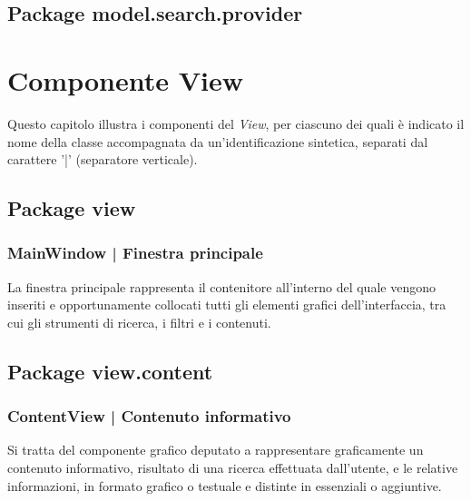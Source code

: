 \documentclass[10pt,a4paper,headinclude,footinclude,hidelinks]{scrreprt} %
\begin{document}
	\section{Package model.search.provider}
	\label{sec:stage:design:sistema:model.search.provider}

	\chapter{Componente View}
	\label{ch:stage:design:view}
	Questo capitolo illustra i componenti del \textit{View}, per ciascuno dei quali è indicato il nome della classe accompagnata da un'identificazione sintetica, separati dal carattere '|' (separatore verticale).

	\section{Package view}
	\label{sec:stage:design:sistema:view}
	
	\subsection[MainWindow]{MainWindow | Finestra principale}
	La finestra principale rappresenta il contenitore all'interno del quale vengono inseriti e opportunamente collocati tutti gli elementi grafici dell'interfaccia, tra cui gli strumenti di ricerca, i filtri e i contenuti.

	\section{Package view.content}
	\label{sec:stage:design:sistema:view.content}

	\subsection[ContentView]{ContentView | Contenuto informativo}
	Si tratta del componente grafico deputato a rappresentare graficamente un contenuto informativo, risultato di una ricerca effettuata dall'utente, e le relative informazioni, in formato grafico o testuale e distinte in essenziali o aggiuntive.
\end{document}
